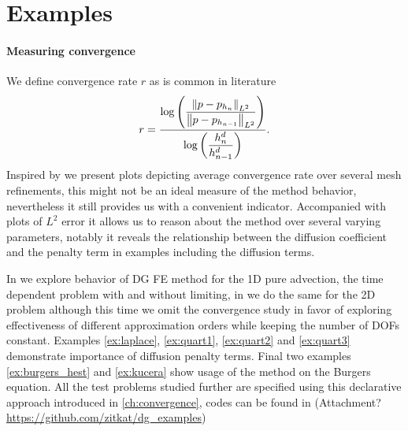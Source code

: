 \section{Examples}

\paragraph{Measuring convergence} We define convergence rate $r$ as is common
in literature
\begin{equation}
r = \frac{\log\left(\dfrac{\left\lVert p - p_{h_{n}}\right\rVert_{L^2}}{\left\lVert p - p_{h_{n-1}}\right\rVert_{L^2}}\right)}
{\log\left(\dfrac{h^d_{n}}{h^d_{n-1}}\right)}.
\end{equation}
Inspired by \cite{Kucera} we present plots depicting average convergence rate
over several mesh refinements, this might not be an ideal measure of the method
behavior, nevertheless it still provides us with a convenient indicator.
Accompanied with plots of $L^2$ error it allows us to reason about the method over
several varying parameters, notably it reveals the relationship between the diffusion
coefficient and the penalty term in examples including the diffusion terms.

In  we explore behavior of DG FE method for the 1D pure advection,
the time dependent problem with and without limiting, in  we do the same
for the 2D problem although this time we omit the convergence study in favor of exploring
effectiveness of different approximation orders while keeping the number of DOFs
constant. Examples \ref{ex:laplace}, \ref{ex:quart1}, \ref{ex:quart2} and \ref{ex:quart3}
demonstrate importance of diffusion penalty terms. Final two examples
\ref{ex:burgers_hest} and
\ref{ex:kucera} show usage of the method on the Burgers equation. All the test problems
studied further are specified using this declarative approach introduced in
\ref{ch:convergence}, codes can be found in (\todo Attachment?
\url{https://github.com/zitkat/dg_examples})
